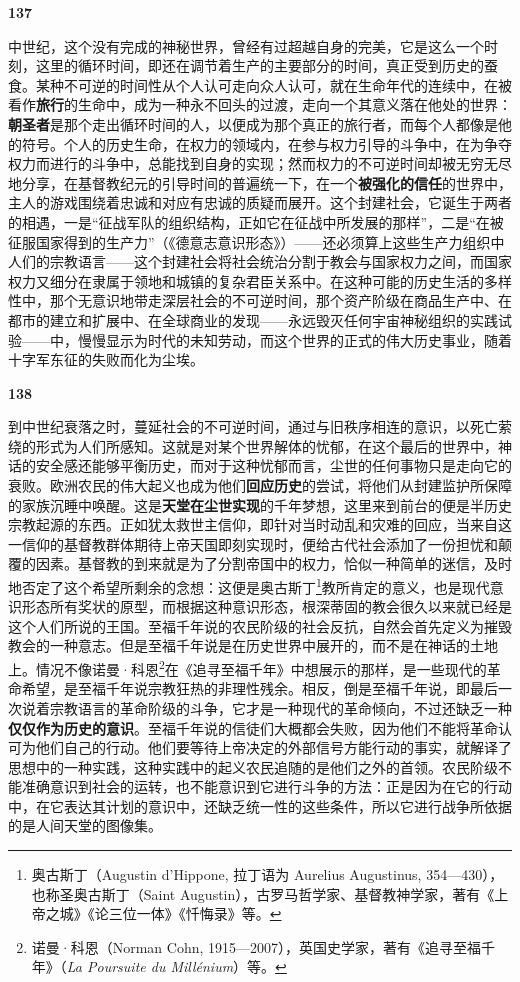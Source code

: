 \documentclass[fontset=fandol, a4paper, 12pt, openright]{ctexbook}
\makeatletter
\newcommand{\thesis}[1]{%
    \par\vspace{1.5em}%
    {\centering \textbf{\Large #1}\par}%
    \nobreak\vspace{0.5em}\nobreak
    \@afterindenttrue %
    \@afterheading    %
}
\makeatother
\begin{document}
\thesis{137}
中世纪，这个没有完成的神秘世界，曾经有过超越自身的完美，它是这么一个时刻，这里的循环时间，即还在调节着生产的主要部分的时间，真正受到历史的蚕食。某种不可逆的时间性从个人认可走向众人认可，就在生命年代的连续中，在被看作\textbf{旅行}的生命中，成为一种永不回头的过渡，走向一个其意义落在他处的世界：\textbf{朝圣者}是那个走出循环时间的人，以便成为那个真正的旅行者，而每个人都像是他的符号。个人的历史生命，在权力的领域内，在参与权力引导的斗争中，在为争夺权力而进行的斗争中，总能找到自身的实现；然而权力的不可逆时间却被无穷无尽地分享，在基督教纪元的引导时间的普遍统一下，在一个\textbf{被强化的信任}的世界中，主人的游戏围绕着忠诚和对应有忠诚的质疑而展开。这个封建社会，它诞生于两者的相遇，一是“征战军队的组织结构，正如它在征战中所发展的那样”，二是“在被征服国家得到的生产力”（《德意志意识形态》）——还必须算上这些生产力组织中人们的宗教语言——这个封建社会将社会统治分割于教会与国家权力之间，而国家权力又细分在隶属于领地和城镇的复杂君臣关系中。在这种可能的历史生活的多样性中，那个无意识地带走深层社会的不可逆时间，那个资产阶级在商品生产中、在都市的建立和扩展中、在全球商业的发现——永远毁灭任何宇宙神秘组织的实践试验——中，慢慢显示为时代的未知劳动，而这个世界的正式的伟大历史事业，随着十字军东征的失败而化为尘埃。

\thesis{138}
到中世纪衰落之时，蔓延社会的不可逆时间，通过与旧秩序相连的意识，以死亡萦绕的形式为人们所感知。这就是对某个世界解体的忧郁，在这个最后的世界中，神话的安全感还能够平衡历史，而对于这种忧郁而言，尘世的任何事物只是走向它的衰败。欧洲农民的伟大起义也成为他们\textbf{回应历史}的尝试，将他们从封建监护所保障的家族沉睡中唤醒。这是\textbf{天堂在尘世实现}的千年梦想，这里来到前台的便是半历史宗教起源的东西。正如犹太救世主信仰，即针对当时动乱和灾难的回应，当来自这一信仰的基督教群体期待上帝天国即刻实现时，便给古代社会添加了一份担忧和颠覆的因素。基督教的到来就是为了分割帝国中的权力，恰似一种简单的迷信，及时地否定了这个希望所剩余的念想：这便是奥古斯丁\footnote{奥古斯丁（Augustin d'Hippone, 拉丁语为 Aurelius Augustinus, 354—430），也称圣奥古斯丁（Saint Augustin），古罗马哲学家、基督教神学家，著有《上帝之城》《论三位一体》《忏悔录》等。}教所肯定的意义，也是现代意识形态所有奖状的原型，而根据这种意识形态，根深蒂固的教会很久以来就已经是这个人们所说的王国。至福千年说的农民阶级的社会反抗，自然会首先定义为摧毁教会的一种意志。但是至福千年说是在历史世界中展开的，而不是在神话的土地上。情况不像诺曼·科恩\footnote{诺曼·科恩（Norman Cohn, 1915—2007），英国史学家，著有《追寻至福千年》（\textit{La Poursuite du Millénium}）等。}在《追寻至福千年》中想展示的那样，是一些现代的革命希望，是至福千年说宗教狂热的非理性残余。相反，倒是至福千年说，即最后一次说着宗教语言的革命阶级的斗争，它才是一种现代的革命倾向，不过还缺乏一种\textbf{仅仅作为历史的意识}。至福千年说的信徒们大概都会失败，因为他们不能将革命认可为他们自己的行动。他们要等待上帝决定的外部信号方能行动的事实，就解译了思想中的一种实践，这种实践中的起义农民追随的是他们之外的首领。农民阶级不能准确意识到社会的运转，也不能意识到它进行斗争的方法：正是因为在它的行动中，在它表达其计划的意识中，还缺乏统一性的这些条件，所以它进行战争所依据的是人间天堂的图像集。
\end{document}
